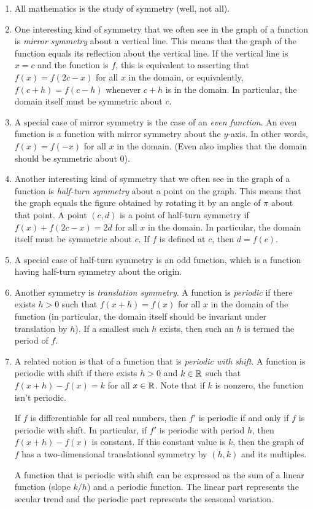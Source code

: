 \documentclass[10pt]{amsart}
\begin{document}
\begin{enumerate}
\item All mathematics is the study of symmetry (well, not all).
\item One interesting kind of symmetry that we often see in the graph
  of a function is {\em mirror symmetry} about a vertical line. This
  means that the graph of the function equals its reflection about the
  vertical line. If the vertical line is $x = c$ and the function is
  $f$, this is equivalent to asserting that $f(x) = f(2c - x)$ for all
  $x$ in the domain, or equivalently, $f(c + h) = f(c - h)$ whenever
  $c + h$ is in the domain. In particular, the domain itself must be
  symmetric about $c$.
\item A special case of mirror symmetry is the case of an {\em even
  function}. An even function is a function with mirror symmetry about
  the $y$-axis. In other words, $f(x) = f(-x)$ for all $x$ in the
  domain. (Even also implies that the domain should be symmetric about $0$).
\item Another interesting kind of symmetry that we often see in the
  graph of a function is {\em half-turn symmetry} about a point on the
  graph. This means that the graph equals the figure obtained by
  rotating it by an angle of $\pi$ about that point. A point $(c,d)$
  is a point of half-turn symmetry if $f(x) + f(2c - x) = 2d$ for all
  $x$ in the domain. In particular, the domain itself must be
  symmetric about $c$. If $f$ is defined at $c$, then $d = f(c)$.
\item A special case of half-turn symmetry is an odd function, which
  is a function having half-turn symmetry about the origin.
\item Another symmetry is {\em translation symmetry}. A function is
  {\em periodic} if there exists $h > 0$ such that $f(x + h) = f(x)$
  for all $x$ in the domain of the function (in particular, the domain
  itself should be invariant under translation by $h$). If a smallest
  such $h$ exists, then such an $h$ is termed the period of $f$.
\item A related notion is that of a function that is {\em periodic
  with shift}. A function is periodic with shift if there exists $h >
  0$ and $k \in \mathbb{R}$ such that $f(x + h) - f(x) = k$ for all $x \in
  \mathbb{R}$. Note that if $k$ is nonzero, the function isn't periodic.

  If $f$ is differentiable for all real numbers, then $f'$ is periodic
  if and only if $f$ is periodic with shift. In particular, if $f'$ is
  periodic with period $h$, then $f(x + h) - f(x)$ is constant. If
  this constant value is $k$, then the graph of $f$ has a
  two-dimensional translational symmetry by $(h,k)$ and its multiples.

  A function that is periodic with shift can be expressed as the sum
  of a linear function (slope $k/h$) and a periodic function. The
  linear part represents the secular trend and the periodic part
  represents the seasonal variation.
\end{enumerate}
\end{document}
